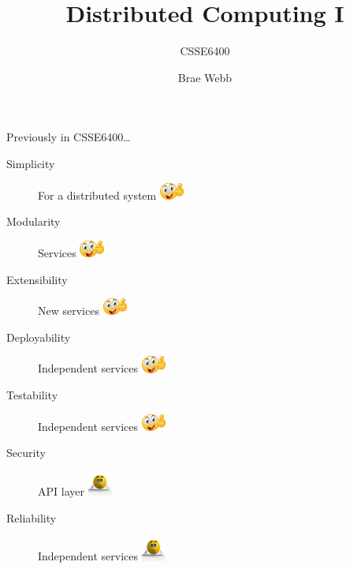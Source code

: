 \documentclass{slide}
\title{Distributed Computing I}
\subtitle{CSSE6400}
\author{Brae Webb}
\date{\week{5}}
\begin{document}
\maketitle




\begin{frame}{Previously in CSSE6400\dots}
    \vspace{1mm}
    {\LARGE
    \begin{description}
        \item[Simplicity] For a distributed system \tabto{15em}\includegraphics[width=8mm]{../../shared/images/thumbs-up.png}
        \item[Modularity] Services \tabto{15em}\includegraphics[width=8mm]{../../shared/images/thumbs-up.png}
        \item[Extensibility] New services \tabto{15em}\includegraphics[width=8mm]{../../shared/images/thumbs-up.png}
        \item[Deployability] Independent services \tabto{15em}\includegraphics[width=8mm]{../../shared/images/thumbs-up.png}
        \item[Testability] Independent services \tabto{15em}\includegraphics[width=8mm]{../../shared/images/thumbs-up.png}
        \item[Security] API layer \tabto{15em}\includegraphics[trim=57 145 70 85,clip,width=8mm]{../../shared/images/neutral.png}
        \item[Reliability] Independent services \tabto{15em}\includegraphics[trim=57 145 70 85,clip,width=8mm]{../../shared/images/neutral.png}

\end{description}}
\end{frame}
\end{document}
